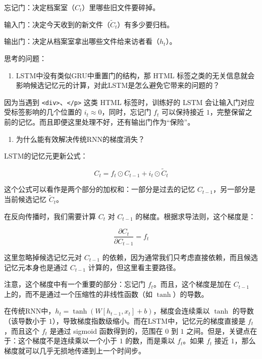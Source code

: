 忘记门：决定档案室（\(C_t\)）里哪些旧文件要碎掉。

输入门：决定今天收到的新文件（\(\tilde{C}_t\)）有多少要归档。

输出门：决定从档案室拿出哪些文件给来访者看（\(h_t\)）。

思考的问题：

\begin{enumerate}
\def\labelenumi{\arabic{enumi}.}
\tightlist
\item
  LSTM中没有类似GRU中重置门的结构，那 HTML 标签之类的无关信息就会影响候选记忆元的计算，对此LSTM是怎么避免它带来的问题的？
\end{enumerate}

因为当遇到 \texttt{\textless{}div\textgreater{}}、\texttt{\textless{}/p\textgreater{}} 这类 HTML 标签时，训练好的 LSTM 会让输入门对应受标签影响的几个位置的 \(i_t \approx 0\)，同时，忘记门 \(f_t\) 可以保持接近 \(1\)，完整保留之前的记忆。而且即便这里处理不好，还有输出门作为``保险''。

\begin{enumerate}
\def\labelenumi{\arabic{enumi}.}
\setcounter{enumi}{1}
\tightlist
\item
  为什么能有效解决传统RNN的梯度消失？
\end{enumerate}

LSTM的记忆元更新公式：

\[
C_t = f_t \odot C_{t-1} + i_t \odot \tilde{C}_t
\]

这个公式可以看作是两个部分的加权和：一部分是过去的记忆 \(C_{t-1}\)，另一部分是当前候选记忆 \(\tilde{C}_t\)。

在反向传播时，我们需要计算 \(C_t\) 对 \(C_{t-1}\) 的梯度。根据求导法则，这个梯度是：

\[
\frac{\partial C_t}{\partial C_{t-1}} = f_t
\]

这里忽略掉候选记忆元对 \(C_{t-1}\) 的依赖，因为通常我们只考虑直接依赖，而且候选记忆元本身也是通过 \(C_{t-1}\) 计算的，但这里看主要路径。

注意，这个梯度中有一个重要的部分：忘记门 \(f_t\)。而且，这个梯度是加在 \(C_{t-1}\) 上的，而不是通过一个压缩性的非线性函数（如 \(\tanh\)）的导数。

在传统RNN中，\(h_t = \tanh(W [h_{t-1}, x_t] + b)\)，梯度会连续乘以 \(\tanh\) 的导数（该导数小于 \(1\)），导致梯度指数级缩小。而在LSTM中，记忆元的梯度直接是 \(f_t\)，而且这个 \(f_t\) 是通过 sigmoid 函数得到的，范围在 \(0\) 到 \(1\) 之间。但是，关键点在于：这个梯度不是连续乘以一个小于 \(1\) 的数，而是乘以 \(f_t\)。如果 \(f_t\) 接近 \(1\)，那么梯度就可以几乎无损地传递到上一个时间步。

